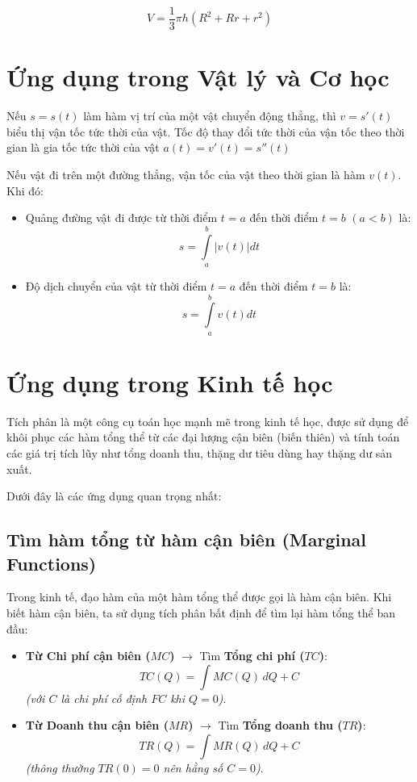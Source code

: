 \documentclass[12pt,a4paper,oneside]{book}
\theoremstyle{theorem}
\theoremstyle{definition}
\begin{document}
\[
V=\frac{1}{3}\pi h\left(R^2+Rr+r^2\right)
\]
\section{Ứng dụng trong Vật lý và Cơ học}

Nếu $s=s(t)$ làm hàm vị trí của một vật chuyển động thẳng, thì $v=s'(t)$ biểu thị vận tốc tức thời của vật. Tốc độ thay đổi tức thời của vận tốc theo thời gian là gia tốc tức thời của vật $a(t)= v'(t)=s''(t)$

Nếu vật đi trên một đường thẳng, vận tốc của vật theo thời gian là hàm $v(t)$. Khi đó:
\begin{itemize}
    \item Quảng đường vật đi được từ thời điểm $t=a$ đến thời điểm $t=b$ $(a<b)$ là:
    \[
    s= \int\limits_{a}^{b} |v(t)|dt
    \]
    \item Độ dịch chuyển của vật từ thời điểm $t=a$ đến thời điểm $t=b$ là:
    \[
    s= \int\limits_{a}^{b} v(t)dt
    \]
\end{itemize}
\section{Ứng dụng trong Kinh tế học}
Tích phân là một công cụ toán học mạnh mẽ trong kinh tế học, được sử dụng để khôi phục các hàm tổng thể từ các đại lượng cận biên (biến thiên) và tính toán các giá trị tích lũy như tổng doanh thu, thặng dư tiêu dùng hay thặng dư sản xuất.

Dưới đây là các ứng dụng quan trọng nhất:

\subsection{Tìm hàm tổng từ hàm cận biên (Marginal Functions)}
Trong kinh tế, đạo hàm của một hàm tổng thể được gọi là hàm cận biên. Khi biết hàm cận biên, ta sử dụng tích phân bất định để tìm lại hàm tổng thể ban đầu:

\begin{itemize}
    \item \textbf{Từ Chi phí cận biên ($MC$)} $\rightarrow$ Tìm \textbf{Tổng chi phí ($TC$)}:
        \[TC(Q) = \int MC(Q) \, dQ + C\]
    \textit{(với $C$ là chi phí cố định $FC$ khi $Q = 0$)}.
    
    \item \textbf{Từ Doanh thu cận biên ($MR$)} $\rightarrow$ Tìm \textbf{Tổng doanh thu ($TR$)}:
        \[TR(Q) = \int MR(Q) \, dQ + C\]
    \textit{(thông thường $TR(0) = 0$ nên hằng số $C = 0$)}.
\end{itemize}
\end{document}
